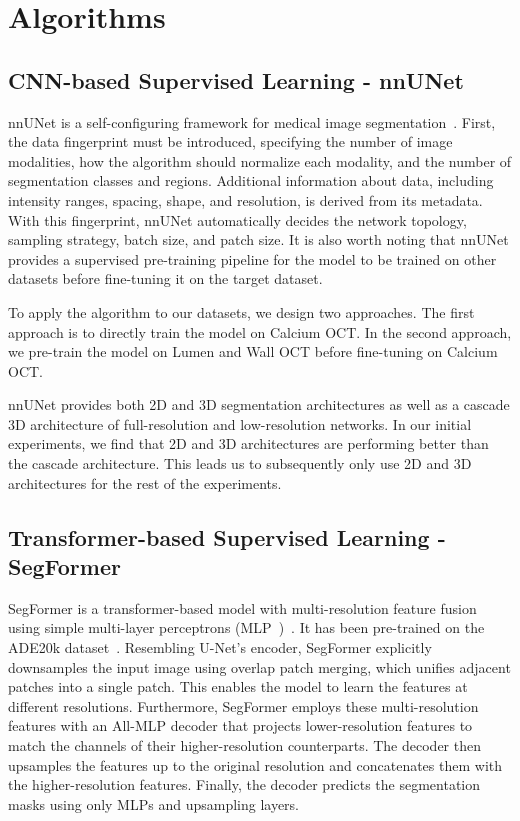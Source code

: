 \documentclass[a4paper,11pt,oneside]{report}
\begin{document}
\newpage
\section{Algorithms}
\subsection{CNN-based Supervised Learning - nnUNet}\label{sec:design:nnunet}
nnUNet is a self-configuring framework for medical image segmentation~\cite{Isensee2020}. First, the data fingerprint must be introduced, specifying the number of image modalities, how the algorithm should normalize each modality, and the number of segmentation classes and regions. Additional information about data, including intensity ranges, spacing, shape, and resolution, is derived from its metadata. With this fingerprint, nnUNet automatically decides the network topology, sampling strategy, batch size, and patch size. It is also worth noting that nnUNet provides a supervised pre-training pipeline for the model to be trained on other datasets before fine-tuning it on the target dataset.

To apply the algorithm to our datasets, we design two approaches. The first approach is to directly train the model on Calcium OCT. In the second approach, we pre-train the model on Lumen and Wall OCT before fine-tuning on Calcium OCT. 

nnUNet provides both 2D and 3D segmentation architectures as well as a cascade 3D architecture of full-resolution and low-resolution networks. In our initial experiments, we find that 2D and 3D architectures are performing better than the cascade architecture. This leads us to subsequently only use 2D and 3D architectures for the rest of the experiments.


\subsection{Transformer-based Supervised Learning - SegFormer}
SegFormer is a transformer-based model with multi-resolution feature fusion using simple multi-layer perceptrons (MLP~\cite{Rumelhart1986})~\cite{Xie2021SegFormer}. It has been pre-trained on the ADE20k dataset~\cite{Zhou2018}. Resembling U-Net's encoder, SegFormer explicitly downsamples the input image using overlap patch merging, which unifies adjacent patches into a single patch. This enables the model to learn the features at different resolutions. Furthermore, SegFormer employs these multi-resolution features with an All-MLP decoder that projects lower-resolution features to match the channels of their higher-resolution counterparts. The decoder then upsamples the features up to the original resolution and concatenates them with the higher-resolution features. Finally, the decoder predicts the segmentation masks using only MLPs and upsampling layers. 
\end{document}
